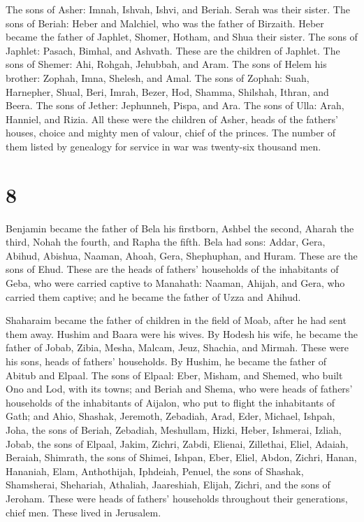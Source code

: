  The sons of Asher: Imnah, Ishvah, Ishvi, and Beriah.
Serah was their sister.  The sons of Beriah: Heber and
Malchiel, who was the father of Birzaith.  Heber became
the father of Japhlet, Shomer, Hotham, and Shua their sister.
 The sons of Japhlet: Pasach, Bimhal, and Ashvath. These
are the children of Japhlet.  The sons of Shemer: Ahi,
Rohgah, Jehubbah, and Aram.  The sons of Helem his
brother: Zophah, Imna, Shelesh, and Amal.  The sons of
Zophah: Suah, Harnepher, Shual, Beri, Imrah,  Bezer, Hod,
Shamma, Shilshah, Ithran, and Beera.  The sons of Jether:
Jephunneh, Pispa, and Ara.  The sons of Ulla: Arah,
Hanniel, and Rizia.  All these were the children of
Asher, heads of the fathers' houses, choice and mighty men of valour,
chief of the princes. The number of them listed by genealogy for service
in war was twenty-six thousand men.

\hypertarget{section-7}{%
\section{8}\label{section-7}}

 Benjamin became the father of Bela his firstborn, Ashbel
the second, Aharah the third,  Nohah the fourth, and Rapha
the fifth.  Bela had sons: Addar, Gera, Abihud,
 Abishua, Naaman, Ahoah,  Gera, Shephuphan,
and Huram.  These are the sons of Ehud. These are the
heads of fathers' households of the inhabitants of Geba, who were
carried captive to Manahath:  Naaman, Ahijah, and Gera,
who carried them captive; and he became the father of Uzza and Ahihud.

 Shaharaim became the father of children in the field of
Moab, after he had sent them away. Hushim and Baara were his wives.
 By Hodesh his wife, he became the father of Jobab, Zibia,
Mesha, Malcam,  Jeuz, Shachia, and Mirmah. These were his
sons, heads of fathers' households.  By Hushim, he became
the father of Abitub and Elpaal.  The sons of Elpaal:
Eber, Misham, and Shemed, who built Ono and Lod, with its towns;
 and Beriah and Shema, who were heads of fathers'
households of the inhabitants of Aijalon, who put to flight the
inhabitants of Gath;  and Ahio, Shashak, Jeremoth,
 Zebadiah, Arad, Eder,  Michael, Ishpah,
Joha, the sons of Beriah,  Zebadiah, Meshullam, Hizki,
Heber,  Ishmerai, Izliah, Jobab, the sons of Elpaal,
 Jakim, Zichri, Zabdi,  Elienai,
Zillethai, Eliel,  Adaiah, Beraiah, Shimrath, the sons of
Shimei,  Ishpan, Eber, Eliel,  Abdon,
Zichri, Hanan,  Hananiah, Elam, Anthothijah,
 Iphdeiah, Penuel, the sons of Shashak, 
Shamsherai, Shehariah, Athaliah,  Jaareshiah, Elijah,
Zichri, and the sons of Jeroham.  These were heads of
fathers' households throughout their generations, chief men. These lived
in Jerusalem.

